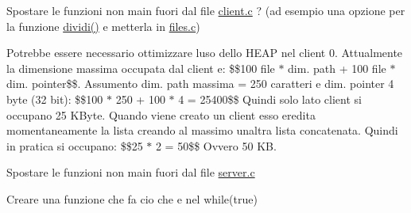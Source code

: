 
\begin{DoxyRefList}
\item[\label{todo__todo000001}%
\Hypertarget{todo__todo000001}%
File \hyperlink{client_8c}{client.c} ]Spostare le funzioni non main fuori dal file \hyperlink{client_8c}{client.\+c} ? (ad esempio una opzione per la funzione \hyperlink{client_8c_a55586f2b7e9b3620294cf78cda8abdad}{dividi()} e\textquotesingle{} metterla in \hyperlink{files_8c}{files.\+c})  
\item[\label{todo__todo000002}%
\Hypertarget{todo__todo000002}%
Globale \hyperlink{client_8h_a8c7084a254c7cd640d66e647795ff8f6}{operazioni\+\_\+client0} ()]Potrebbe essere necessario ottimizzare l\textquotesingle{}uso dello H\+E\+AP nel client 0. Attualmente la dimensione massima occupata dal client e\textquotesingle{}\+: \$\$100 file $\ast$ dim. path + 100 file $\ast$ dim. pointer\$\$. Assumento dim. path massima = 250 caratteri e dim. pointer 4 byte (32 bit)\+: \$\$100 $\ast$ 250 + 100 $\ast$ 4 = 25400\$\$ Quindi solo lato client si occupano 25 K\+Byte. Quando viene creato un client esso eredita momentaneamente la lista creando al massimo un\textquotesingle{}altra lista concatenata. Quindi in pratica si occupano\+: \$\$25 $\ast$ 2 = 50\$\$ Ovvero 50 KB. 
\item[\label{todo__todo000003}%
\Hypertarget{todo__todo000003}%
File \hyperlink{server_8c}{server.c} ]Spostare le funzioni non main fuori dal file \hyperlink{server_8c}{server.\+c} 

Creare una funzione che fa cio\textquotesingle{} che e\textquotesingle{} nel while(true)
\end{DoxyRefList}